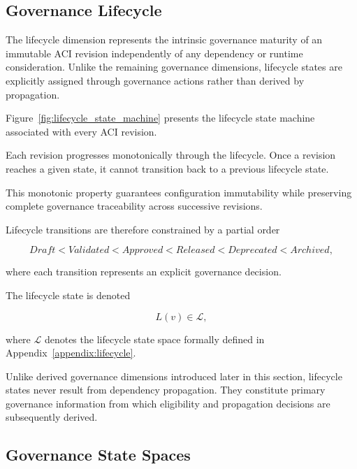 \documentclass[10pt]{article}
\begin{document}
	\subsection{Governance Lifecycle}
	\label{sec:lifecycle_semantics}
	
	The lifecycle dimension represents the intrinsic governance maturity of an immutable ACI revision independently of any dependency or runtime consideration. Unlike the remaining governance dimensions, lifecycle states are explicitly assigned through governance actions rather than derived by propagation.
	
	Figure~\ref{fig:lifecycle_state_machine} presents the lifecycle state machine associated with every ACI revision.
	
	Each revision progresses monotonically through the lifecycle. Once a revision reaches a given state, it cannot transition back to a previous lifecycle state.
	
	This monotonic property guarantees configuration immutability while preserving complete governance traceability across successive revisions.
	
	Lifecycle transitions are therefore constrained by a partial order
	
	\begin{equation}
		Draft
		<
		Validated
		<
		Approved
		<
		Released
		<
		Deprecated
		<
		Archived,
		\label{eq:lifecycle_order}
	\end{equation}
	
	where each transition represents an explicit governance decision.
	
	The lifecycle state is denoted
	
	\begin{equation}
		L(v)\in\mathcal{L},
		\label{eq:lifecycle_state}
	\end{equation}
	
	where $\mathcal{L}$ denotes the lifecycle state space formally defined in Appendix~\ref{appendix:lifecycle}.
	
	Unlike derived governance dimensions introduced later in this section, lifecycle states never result from dependency propagation. They constitute primary governance information from which eligibility and propagation decisions are subsequently derived.
	
	\subsection{Governance State Spaces}
	\label{sec:governance_state_spaces}
	
\end{document}

